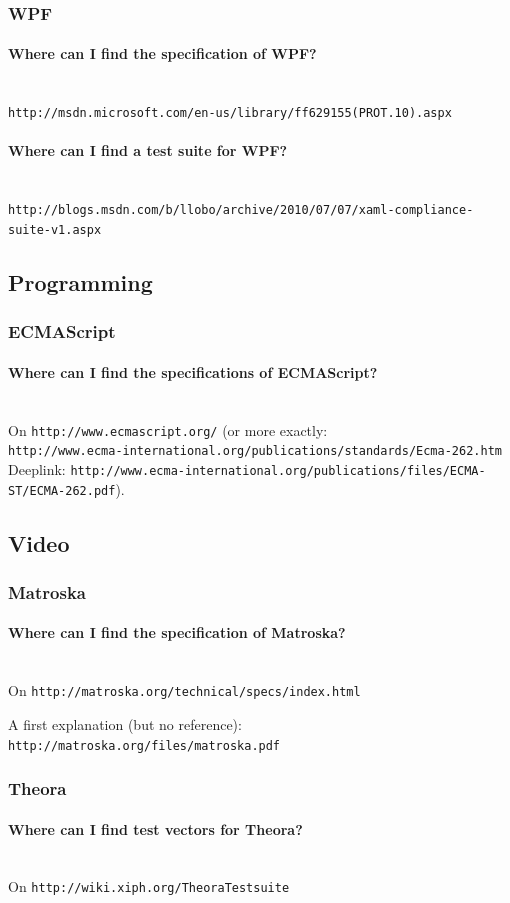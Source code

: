 \documentclass[10pt]{scrbook}
\begin{document}
\subsubsection{WPF}

\paragraph{Where can I find the specification of WPF?} ~ \\
\verb|http://msdn.microsoft.com/en-us/library/ff629155(PROT.10).aspx|

\paragraph{Where can I find a test suite for WPF?} ~ \\
\verb|http://blogs.msdn.com/b/llobo/archive/2010/07/07/xaml-compliance-suite-v1.aspx|

\subsection{Programming}

\subsubsection{ECMAScript}

\paragraph{Where can I find the specifications of ECMAScript?} ~ \\
On \verb|http://www.ecmascript.org/| (or more exactly: \\
\verb|http://www.ecma-international.org/publications/standards/Ecma-262.htm| \\
Deeplink: \verb|http://www.ecma-international.org/publications/files/ECMA-ST/ECMA-262.pdf|).

\subsection{Video}

\subsubsection{Matroska}

\paragraph{Where can I find the specification of Matroska?} ~ \\
On \verb|http://matroska.org/technical/specs/index.html|

A first explanation (but no reference): \verb|http://matroska.org/files/matroska.pdf|

\subsubsection{Theora}

\paragraph{Where can I find test vectors for Theora?} ~ \\
On \verb|http://wiki.xiph.org/TheoraTestsuite|
\end{document}
